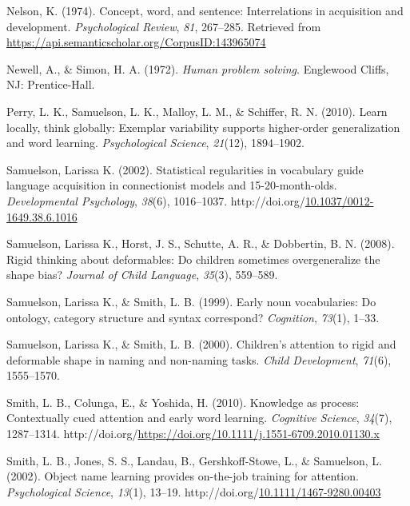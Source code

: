 \documentclass[10pt, letterpaper]{article}
\newenvironment{CSLReferences}%
  {}%
  {\par}
\begin{document}
\begin{CSLReferences}{1}{0}
\leavevmode{}%
Nelson, K. (1974). Concept, word, and sentence: Interrelations in
acquisition and development. \emph{Psychological Review}, \emph{81},
267--285. Retrieved from
\url{https://api.semanticscholar.org/CorpusID:143965074}

\leavevmode{}%
Newell, A., \& Simon, H. A. (1972). \emph{Human problem solving}.
Englewood Cliffs, NJ: Prentice-Hall.

\leavevmode{}%
Perry, L. K., Samuelson, L. K., Malloy, L. M., \& Schiffer, R. N.
(2010). Learn locally, think globally: Exemplar variability supports
higher-order generalization and word learning. \emph{Psychological
Science}, \emph{21}(12), 1894--1902.

\leavevmode{}%
Samuelson, Larissa K. (2002). Statistical regularities in vocabulary
guide language acquisition in connectionist models and 15-20-month-olds.
\emph{Developmental Psychology}, \emph{38}(6), 1016--1037.
http://doi.org/\href{https://doi.org/10.1037/0012-1649.38.6.1016}{10.1037/0012-1649.38.6.1016}

\leavevmode{}%
Samuelson, Larissa K., Horst, J. S., Schutte, A. R., \& Dobbertin, B. N.
(2008). Rigid thinking about deformables: Do children sometimes
overgeneralize the shape bias? \emph{Journal of Child Language},
\emph{35}(3), 559--589.

\leavevmode{}%
Samuelson, Larissa K., \& Smith, L. B. (1999). Early noun vocabularies:
Do ontology, category structure and syntax correspond? \emph{Cognition},
\emph{73}(1), 1--33.

\leavevmode{}%
Samuelson, Larissa K., \& Smith, L. B. (2000). Children's attention to
rigid and deformable shape in naming and non-naming tasks. \emph{Child
Development}, \emph{71}(6), 1555--1570.

\leavevmode{}%
Smith, L. B., Colunga, E., \& Yoshida, H. (2010). Knowledge as process:
Contextually cued attention and early word learning. \emph{Cognitive
Science}, \emph{34}(7), 1287--1314.
http://doi.org/\url{https://doi.org/10.1111/j.1551-6709.2010.01130.x}

\leavevmode{}%
Smith, L. B., Jones, S. S., Landau, B., Gershkoff-Stowe, L., \&
Samuelson, L. (2002). Object name learning provides on-the-job training
for attention. \emph{Psychological Science}, \emph{13}(1), 13--19.
http://doi.org/\href{https://doi.org/10.1111/1467-9280.00403}{10.1111/1467-9280.00403}


\end{CSLReferences}
\end{document}
